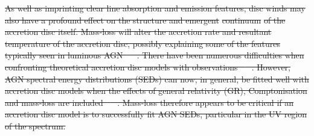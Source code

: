 \documentclass[useAMS,usenatbib]{mn2e_x}
\providecommand{\DIFdel}[1]{{\protect\color{red}\sout{#1}}}                      %
\providecommand{\DIFdelbegin}{} %
\providecommand{\DIFdelend}{} %
\begin{document}
\DIFdelbegin \DIFdel{As well as imprinting clear line absorption and emission
features, disc winds may also have a profound effect on the structure and 
emergent }%
\DIFdel{continuum}%
\DIFdel{of the accretion disc itself.
Mass-loss will alter the accretion rate and resultant 
temperature of the accretion disc, possibly explaining some 
of the features typically seen in luminous AGN \mbox{%
\citep{knigge1999,laordavis2014}
}%
.
There have been numerous difficulties when confronting 
theoretical accretion disc models with observations 
\mbox{%
\citep[see e.g.][]{blaes1998}
}%
. However, AGN spectral energy distributions (SEDs) can now, 
in general, be fitted well with accretion disc models
when the effects of general relativity (GR), Comptonisation
and mass-loss are included \mbox{%
\citep{capellupo2015}
}%
. Mass-loss therefore appears to be 
critical if an accretion disc model is to successfully fit AGN SEDs, 
particular in the UV region of the spectrum.
}\DIFdelend %
\end{document}
